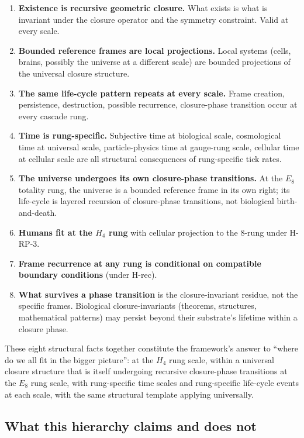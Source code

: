 \documentclass[11pt]{article}
\theoremstyle{plain}
\theoremstyle{definition}
\theoremstyle{remark}
\begin{document}
\begin{enumerate}[leftmargin=2em]
\item \textbf{Existence is recursive geometric closure.} What exists is what is invariant under the closure operator and the symmetry constraint. Valid at every scale.
\item \textbf{Bounded reference frames are local projections.} Local systems (cells, brains, possibly the universe at a different scale) are bounded projections of the universal closure structure.
\item \textbf{The same life-cycle pattern repeats at every scale.} Frame creation, persistence, destruction, possible recurrence, closure-phase transition occur at every cascade rung.
\item \textbf{Time is rung-specific.} Subjective time at biological scale, cosmological time at universal scale, particle-physics time at gauge-rung scale, cellular time at cellular scale are all structural consequences of rung-specific tick rates.
\item \textbf{The universe undergoes its own closure-phase transitions.} At the $E_8$ totality rung, the universe is a bounded reference frame in its own right; its life-cycle is layered recursion of closure-phase transitions, not biological birth-and-death.
\item \textbf{Humans fit at the $H_4$ rung} with cellular projection to the 8-rung under H-RP-3.
\item \textbf{Frame recurrence at any rung is conditional on compatible boundary conditions} (under H-rec).
\item \textbf{What survives a phase transition} is the closure-invariant residue, not the specific frames. Biological closure-invariants (theorems, structures, mathematical patterns) may persist beyond their substrate's lifetime within a closure phase.
\end{enumerate}

These eight structural facts together constitute the framework's answer to ``where do we all fit in the bigger picture'': at the $H_4$ rung scale, within a universal closure structure that is itself undergoing recursive closure-phase transitions at the $E_8$ rung scale, with rung-specific time scales and rung-specific life-cycle events at each scale, with the same structural template applying universally.

\subsection{What this hierarchy claims and does not}
\end{document}
